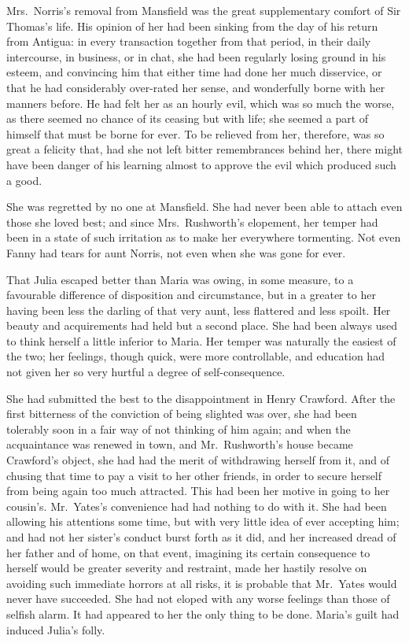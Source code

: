 \documentclass{article}
\begin{document}
Mrs.\ Norris's removal from Mansfield was the great supplementary
comfort of Sir Thomas's life.  His opinion of her had
been sinking from the day of his return from Antigua:
in every transaction together from that period, in their
daily intercourse, in business, or in chat, she had been
regularly losing ground in his esteem, and convincing
him that either time had done her much disservice,
or that he had considerably over-rated her sense,
and wonderfully borne with her manners before.  He had
felt her as an hourly evil, which was so much the worse,
as there seemed no chance of its ceasing but with life;
she seemed a part of himself that must be borne for ever.
To be relieved from her, therefore, was so great a
felicity that, had she not left bitter remembrances
behind her, there might have been danger of his learning
almost to approve the evil which produced such a good.

She was regretted by no one at Mansfield.  She had never
been able to attach even those she loved best; and since
Mrs.\ Rushworth's elopement, her temper had been in a state
of such irritation as to make her everywhere tormenting.
Not even Fanny had tears for aunt Norris, not even when
she was gone for ever.

That Julia escaped better than Maria was owing, in some measure,
to a favourable difference of disposition and circumstance,
but in a greater to her having been less the darling
of that very aunt, less flattered and less spoilt.
Her beauty and acquirements had held but a second place.
She had been always used to think herself a little inferior
to Maria.  Her temper was naturally the easiest of the two;
her feelings, though quick, were more controllable,
and education had not given her so very hurtful a degree
of self-consequence.

She had submitted the best to the disappointment
in Henry Crawford.  After the first bitterness of the
conviction of being slighted was over, she had been
tolerably soon in a fair way of not thinking of him again;
and when the acquaintance was renewed in town,
and Mr.\ Rushworth's house became Crawford's object,
she had had the merit of withdrawing herself from it,
and of chusing that time to pay a visit to her other friends,
in order to secure herself from being again too much attracted.
This had been her motive in going to her cousin's.
Mr.\ Yates's convenience had had nothing to do with it.
She had been allowing his attentions some time,
but with very little idea of ever accepting him;
and had not her sister's conduct burst forth as it did,
and her increased dread of her father and of home,
on that event, imagining its certain consequence to herself
would be greater severity and restraint, made her hastily
resolve on avoiding such immediate horrors at all risks,
it is probable that Mr.\ Yates would never have succeeded.
She had not eloped with any worse feelings than those
of selfish alarm.  It had appeared to her the only
thing to be done.  Maria's guilt had induced Julia's folly.
\end{document}
